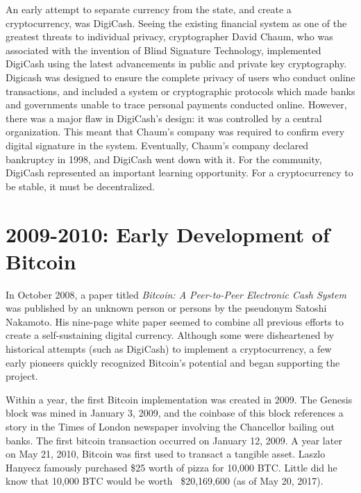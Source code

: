 \documentclass[11pt]{article}
\begin{document}
    An early attempt to separate currency from the state, and create a cryptocurrency, was DigiCash. Seeing the existing financial system as one of the greatest threats to individual privacy, cryptographer David Chaum, who was associated with the invention of Blind Signature Technology, implemented DigiCash using the latest advancements in public and private key cryptography. Digicash was designed to ensure the complete privacy of users who conduct online transactions, and included a system or cryptographic protocols which made banks and governments unable to trace personal payments conducted online. However, there was a major flaw in DigiCash's design: it was controlled by a central organization. This meant that Chaum's company was required to confirm every digital signature in the system. Eventually, Chaum's company declared bankruptcy in 1998, and DigiCash went down with it. For the community, DigiCash represented an important learning opportunity. For a cryptocurrency to be stable, it must be decentralized.
    
    \section*{2009-2010: Early Development of Bitcoin}
    
    In October 2008, a paper titled \emph{Bitcoin: A Peer-to-Peer Electronic Cash System} was published by an unknown person or persons by the pseudonym Satoshi Nakamoto. His nine-page white paper seemed to combine all previous efforts to create a self-sustaining digital currency. Although some were disheartened by historical attempts (such as DigiCash) to implement a cryptocurrency, a few early pioneers quickly recognized Bitcoin's potential and began supporting the project.
    
    Within a year, the first Bitcoin implementation was created in 2009. The Genesis block was mined in January 3, 2009, and the coinbase of this block references a story in the Times of London newspaper involving the Chancellor bailing out banks. The first bitcoin transaction occurred on January 12, 2009. A year later on May 21, 2010, Bitcoin was first used to transact a tangible asset. Laszlo Hanyecz famously purchased \$25 worth of pizza for 10,000 BTC. Little did he know that 10,000 BTC would be worth ~\$20,169,600 (as of May 20, 2017).
\end{document}
